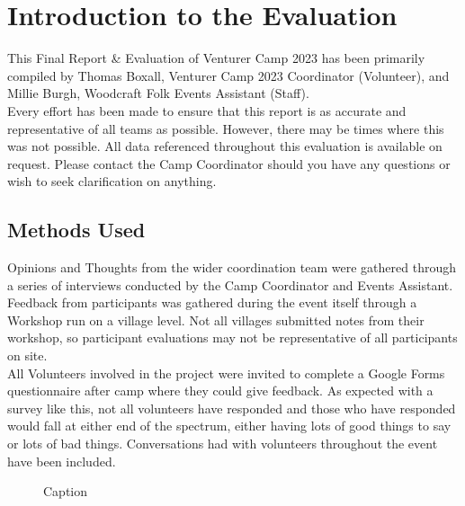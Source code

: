 \chapter{Introduction to the Evaluation}
This Final Report \& Evaluation of Venturer Camp 2023 has been primarily compiled by Thomas Boxall, Venturer Camp 2023 Coordinator (Volunteer), and Millie Burgh, Woodcraft Folk Events Assistant (Staff).\\

Every effort has been made to ensure that this report is as accurate and representative of all teams as possible. However, there may be times where this was not possible. All data referenced throughout this evaluation is available on request. Please contact the Camp Coordinator should you have any questions or wish to seek clarification on anything.

\section{Methods Used}
Opinions and Thoughts from the wider coordination team were gathered through a series of interviews conducted by the Camp Coordinator and Events Assistant. \\

Feedback from participants was gathered during the event itself through a Workshop run on a village level. Not all villages submitted notes from their workshop, so participant evaluations may not be representative of all participants on site. \\

All Volunteers involved in the project were invited to complete a Google Forms questionnaire after camp where they could give feedback. As expected with a survey like this, not all volunteers have responded and those who have responded would fall at either end of the spectrum, either having lots of good things to say or lots of bad things. Conversations had with volunteers throughout the event have been included.
\begin{figure}[h]
    \centering
    \caption{Caption}
    
\end{figure}
